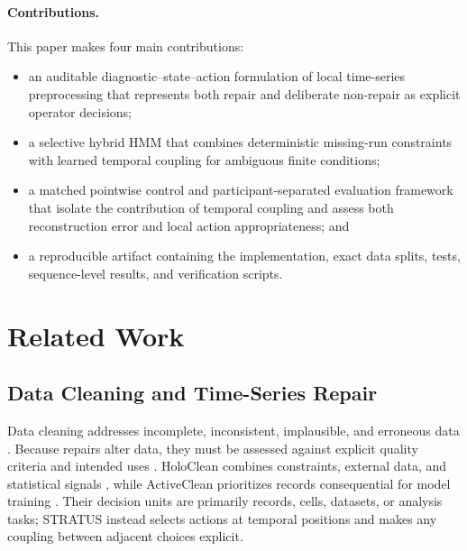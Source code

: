 \documentclass[sigconf,review]{acmart}
\newcommand{\STRATUS}{\textsc{STRATUS}\xspace}
\begin{document}
\paragraph{Contributions.}
This paper makes four main contributions:
\begin{itemize}[leftmargin=*]
    \item an auditable diagnostic--state--action formulation of local
    time-series preprocessing that represents both repair and deliberate
    non-repair as explicit operator decisions;

    \item a selective hybrid HMM that combines deterministic missing-run
    constraints with learned temporal coupling for ambiguous finite
    conditions;

    \item a matched pointwise control and participant-separated evaluation
    framework that isolate the contribution of temporal coupling and assess
    both reconstruction error and local action appropriateness; and

    \item a reproducible artifact containing the implementation, exact data
    splits, tests, sequence-level results, and verification scripts.
\end{itemize}

\section{Related Work}
\label{sec:related_work}

\subsection{Data Cleaning and Time-Series Repair}

Data cleaning addresses incomplete, inconsistent, implausible, and erroneous data \cite{rahm2000data,batini2009methodologies,ilyas2019data}. Because repairs alter data, they must be assessed against explicit quality criteria and intended uses \cite{sadiq2018dataquality}. HoloClean combines constraints, external data, and statistical signals \cite{rekatsinas2017holoclean}, while ActiveClean prioritizes records consequential for model training \cite{krishnan2016activeclean}. Their decision units are primarily records, cells, datasets, or analysis tasks; \STRATUS instead selects actions at temporal positions and makes any coupling between adjacent choices explicit.
\end{document}
